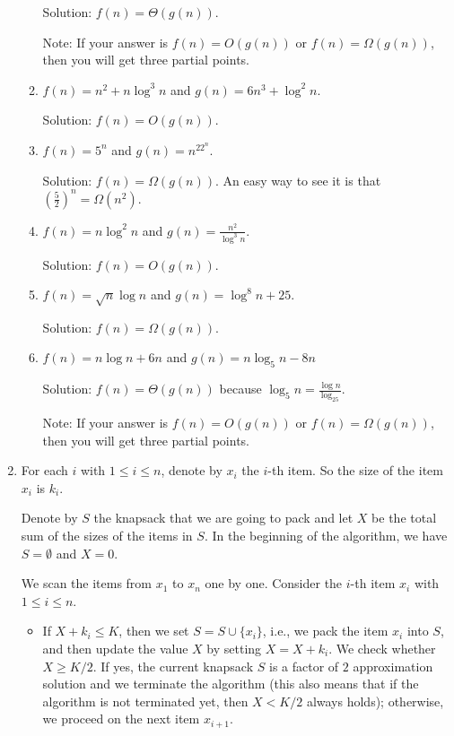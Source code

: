 \documentclass[11pt]{article}
\begin{document}
\begin{enumerate}
\begin{enumerate}
Solution: $f(n)=\Theta(g(n))$.

Note: If your answer is $f(n)=O(g(n))$ or $f(n)=\Omega(g(n))$, then you will get three partial points.

\item $f(n)=n^2+n\log^3 n$ and $g(n)=6n^3+\log^2n$.

Solution: $f(n)=O(g(n))$.

\item $f(n)=5^n$ and $g(n)=n^22^n$.

Solution: $f(n)=\Omega(g(n))$. An easy way to see it is that $(\frac{5}{2})^n=\Omega(n^2)$.

\item $f(n)=n\log^2n$ and $g(n)=\frac{n^2}{\log^3 n}$.

Solution: $f(n)=O(g(n))$.

\item $f(n)=\sqrt{n}\log n$ and $g(n)=\log^8n+25$.

Solution: $f(n)=\Omega(g(n))$.

\item $f(n)= n\log n+6n$ and $g(n) = n\log_5 n-8n$

Solution: $f(n)=\Theta(g(n))$ because $\log_5 n=\frac{\log n}{\log_25}$.

Note: If your answer is $f(n)=O(g(n))$ or $f(n)=\Omega(g(n))$, then you will get three partial points.
\end{enumerate}





\item
	For each $i$ with $1\leq i\leq n$, denote by $x_i$ the $i$-th
	item. So the size of the item $x_i$  is $k_i$.
	
	Denote by $S$ the knapsack that we are going to pack and let $X$ be the total sum of the sizes 	 of the items in $S$. In the beginning of the algorithm, we have
	$S=\emptyset$ and $X=0$.

	We scan the items from $x_1$ to $x_n$ one by one. Consider the
	$i$-th item $x_i$ with $1\leq i\leq n$.

\begin{itemize}
\item

	If $X+k_i\leq K$, then we set $S=S\cup\{x_i\}$, i.e., we pack the item $x_i$ into $S$, and	 then update the value $X$ by setting $X=X+k_i$. We check whether $X\geq K/2$. If yes, the current knapsack $S$ is a factor of $2$ approximation solution and we terminate the algorithm (this also means that if the algorithm is not terminated yet, then $X<K/2$ always holds); otherwise, we proceed on the next item $x_{i+1}$.


\end{itemize}
\end{enumerate}
\end{document}
